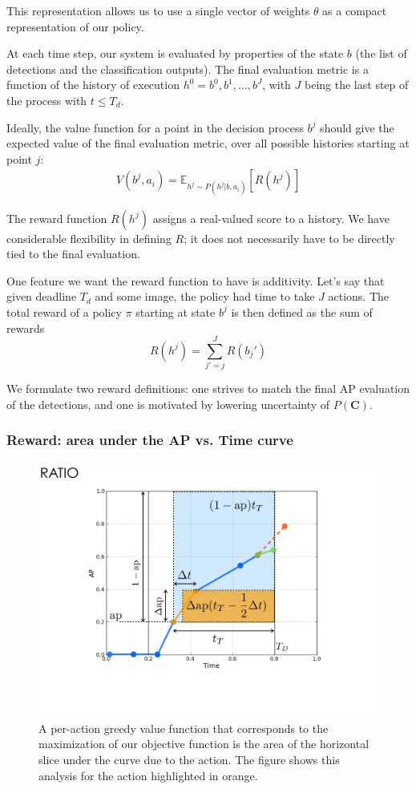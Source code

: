 This representation allows us to use a single vector of weights $\theta$ as a compact representation of our policy.

At each time step, our system is evaluated by properties of the state $b$ (the list of detections and the classification outputs).
The final evaluation metric is a function of the history of execution $h^0=b^0,b^1,\dots,b^J$, with $J$ being the last step of the process with $t \le T_d$.

Ideally, the value function for a point in the decision process $b^j$ should give the expected value of the final evaluation metric, over all possible histories starting at point $j$:
\begin{align}
V(b^j,a_i) = \mathbb{E}_{h^j \sim P(h^j|b,a_i)}[R(h^j)]
\end{align}

The reward function $R(h^j)$ assigns a real-valued score to a history.
We have considerable flexibility in defining $R$; it does not necessarily have to be directly tied to the final evaluation.

One feature we want the reward function to have is additivity.
Let's say that given deadline $T_d$ and some image, the policy had time to take $J$ actions.
The total reward of a policy $\pi$ starting at state $b^j$ is then defined as the sum of rewards
\begin{equation}
R(h^j) = \sum_{j'=j}^J R(b_j')
\end{equation}

We formulate two reward definitions: one strives to match the final AP evaluation of the detections, and one is motivated by lowering uncertainty of $P(\mathbf{C})$.

\subsubsection{Reward: area under the AP vs. Time curve}
\begin{figure}[htb]
  \centering
  \includegraphics[width=0.56\linewidth]{figures/apvst_expl.pdf}
  \caption{A per-action greedy value function that corresponds to the maximization of our objective function is the area of the horizontal slice under the curve due to the action. The figure shows this analysis for the action highlighted in orange.}
  \label{fig:rewards}
\end{figure}

